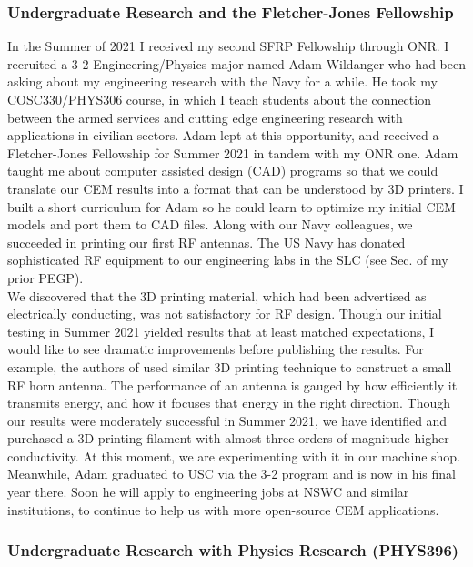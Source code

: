 \documentclass[../../../main.tex]{subfiles}
\begin{document}
\subsubsection{Undergraduate Research and the Fletcher-Jones Fellowship}

In the Summer of 2021 I received my second SFRP Fellowship through ONR.  I recruited a 3-2 Engineering/Physics major named Adam Wildanger who had been asking about my engineering research with the Navy for a while.  He took my COSC330/PHYS306 course, in which I teach students about the connection between the armed services and cutting edge engineering research with applications in civilian sectors.  Adam lept at this opportunity, and received a Fletcher-Jones Fellowship for Summer 2021 in tandem with my ONR one.  Adam taught me about computer assisted design (CAD) programs so that we could translate our CEM results into a format that can be understood by 3D printers.  I built a short curriculum for Adam so he could learn to optimize my initial CEM models and port them to CAD files.  Along with our Navy colleagues, we succeeded in printing our first RF antennas.  The US Navy has donated sophisticated RF equipment to our engineering labs in the SLC (see Sec. of my prior PEGP).
\\
\vspace{0.25cm}
We discovered that the 3D printing material, which had been advertised as electrically conducting, was not satisfactory for RF design.  Though our initial testing in Summer 2021 yielded results that at least matched expectations, I would like to see dramatic improvements before publishing the results.  For example, the authors of \cite{10.1109/access.2019.2932912} used similar 3D printing technique to construct a small RF horn antenna.  The performance of an antenna is gauged by how efficiently it transmits energy, and how it focuses that energy in the right direction.  Though our results were moderately successful in Summer 2021, we have identified and purchased a 3D printing filament with almost three orders of magnitude higher conductivity.  At this moment, we are experimenting with it in our machine shop.  Meanwhile, Adam graduated to USC via the 3-2 program and is now in his final year there.  Soon he will apply to engineering jobs at NSWC and similar institutions, to continue to help us with more open-source CEM applications.

\subsubsection{Undergraduate Research with Physics Research (PHYS396)}
\end{document}

